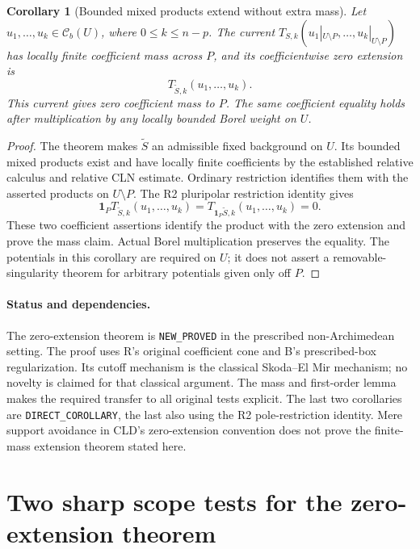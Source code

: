 \documentclass[11pt,a4paper]{article}
\numberwithin{equation}{section}
\newtheorem{corollary}[theorem]{Corollary}
\theoremstyle{definition}
\theoremstyle{remark}
\newcommand{\Cb}{\mathcal C_b}
\begin{document}
\begin{corollary}[Bounded mixed products extend without extra mass]
\label{cor:r3-zero-extension-bt}
Let $u_1,\ldots,u_k\in\Cb(U)$, where $0\leq k\leq n-p$.
The current $T_{S,k}(u_1|_{U\setminus P},\ldots,
u_k|_{U\setminus P})$ has locally finite coefficient
mass across $P$, and its coefficientwise zero extension
is
\[
 T_{\widetilde S,k}(u_1,\ldots,u_k).
\]
This current gives zero coefficient mass to $P$.
The same coefficient equality holds after multiplication
by any locally bounded Borel weight on $U$.
\end{corollary}

\begin{proof}
The theorem makes $\widetilde S$ an admissible fixed
background on $U$. Its bounded mixed products exist
and have locally finite coefficients by the established
relative calculus and relative CLN estimate. Ordinary
restriction identifies them with the asserted products
on $U\setminus P$. The R2 pluripolar restriction identity
gives
\[
 \mathbf1_P T_{\widetilde S,k}(u_1,\ldots,u_k)
 =T_{\mathbf1_P\widetilde S,k}(u_1,\ldots,u_k)=0.
\]
These two coefficient assertions identify the product
with the zero extension and prove the mass claim.
Actual Borel multiplication preserves the equality.
The potentials in this corollary are required on $U$;
it does not assert a removable-singularity theorem
for arbitrary potentials given only off $P$.
\end{proof}

\paragraph{Status and dependencies.}
The zero-extension theorem is \texttt{NEW\_PROVED} in
the prescribed non-Archimedean setting. The proof uses
R's original coefficient cone and B's prescribed-box
regularization. Its cutoff mechanism is the classical
Skoda--El Mir mechanism; no novelty is claimed for
that classical argument. The mass and first-order
lemma makes the required transfer to all original
tests explicit. The last two corollaries are
\texttt{DIRECT\_COROLLARY}, the last also using the
R2 pole-restriction identity. Mere support avoidance
in CLD's zero-extension convention does not prove
the finite-mass extension theorem stated here.



\section{Two sharp scope tests for the zero-extension theorem}
\label{sec:r3-zero-extension-counterexamples}
\end{document}
